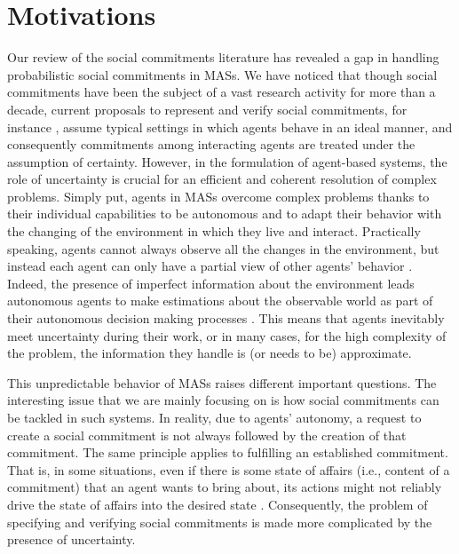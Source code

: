 \section{Motivations} \label{sec:Motivations-chap1}
Our review of the social commitments literature has revealed a gap in handling probabilistic social commitments in MASs. We have noticed that though social commitments have been the subject of a vast research activity for more than a decade, current proposals to represent and verify social commitments, for instance \cite{Bentahar2012,Bentahar2009,Bentahar2004,Colombetti2000,Colombetti2004,El-Menshawy2010,El-Menshawy2013a,Singh2000,Verdicchio2003}, assume typical settings in which agents behave in an ideal manner, and consequently commitments among interacting agents are treated under the assumption of certainty. However, in the formulation of agent-based systems, the role of uncertainty is crucial for an efficient and coherent resolution of complex problems. Simply put, agents in MASs overcome complex problems thanks to their individual capabilities to be autonomous and to adapt their behavior with the changing of the environment in which they live and
interact. Practically speaking, agents cannot always observe all the changes in the environment, but instead each agent can only have a partial view of other agents' behavior \cite{Gammie2004}. Indeed, the presence of imperfect information about the environment leads autonomous agents to make estimations about the observable world as part of their autonomous decision making processes \cite{Walley1996}. This means that agents inevitably meet uncertainty during their work, or in many cases, for the high complexity of the problem, the information they handle is (or needs to be) approximate.


This unpredictable behavior of MASs raises different important questions. The interesting issue that we are mainly focusing on is how social commitments can be tackled in such systems. In reality, due to agents' autonomy, a request to create a social commitment is not always followed by the creation of that commitment. The same principle applies to fulfilling an established commitment. That is, in some situations, even if there is some state of affairs (i.e., content of a commitment) that an agent wants to bring about, its actions might not reliably drive the state of affairs into the desired state \cite{Xuan1999}. Consequently, the problem of specifying and verifying social commitments is made more complicated by the presence of uncertainty.


